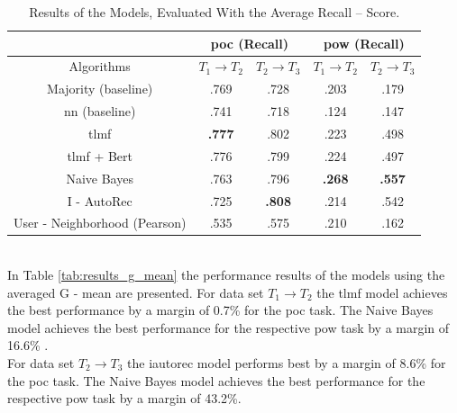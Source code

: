 \begin{table}[h!]
    \centering
    \begin{tabular}{|c|c|c|c|c|}
    \hline
     & \multicolumn{2}{|c|}{\acrshort{poc} (Recall)} & \multicolumn{2}{|c|}{\acrshort{pow} (Recall)} \\
     \hline
    Algorithms & $T_1 \to T_2$ & $T_2 \to T_3$ & $T_1 \to T_2$ & $T_2 \to T_3$\\
    \hline  Majority (baseline) & .769 & .728 & .203 & .179 \\ 
    \acrshort{nn} (baseline) & .741 & .718 & .124 & .147\\
    \acrshort{tlmf} & \textbf{.777} & .802 & .223 & .498 \\
    \acrshort{tlmf} + Bert & .776 & .799 & .224 & .497\\
    Naive Bayes & .763 & .796 & \textbf{.268} & \textbf{.557} \\
    I - AutoRec & .725 & \textbf{.808} & .214 & .542\\
    User - Neighborhood (Pearson) & .535 & .575 & .210 & .162\\
    \hline
    \end{tabular}
    \caption{Results of the Models, Evaluated With the Average Recall – Score.}
    \label{tab:results_recall_mean}
\end{table}\\

\noindent In Table \ref{tab:results_g_mean} the performance results of the models using the averaged G - mean are presented. For data set $T_1 \to T_2$ the \acrshort{tlmf} model achieves the best performance by a margin of 0.7\% for the  \acrshort{poc} task. The Naive Bayes model achieves the best performance for the respective \acrshort{pow} task by a margin of 16.6\% .\\
For data set $T_2 \to T_3$ the \acrshort{iautorec} model performs best by a margin of 8.6\% for the  \acrshort{poc} task. The Naive Bayes model achieves the best performance for the respective \acrshort{pow} task by a margin of 43.2\%. 

